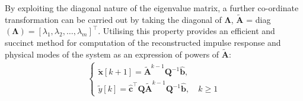 By exploiting the diagonal nature of the eigenvalue matrix, a further co-ordinate transformation can be carried out by taking the diagonal of $\mathbf{\Lambda}$, $\tilde{\mathbf{A}}$ = diag$(\mathbf{\Lambda}) = [\lambda_1, \lambda_2, \dots, \lambda_m]^{\top}$. Utilising this property provides an efficient and succinct method for computation of the reconstructed impulse response and physical modes of the system as an expression of powers of $\tilde{\mathbf{A}}$:
\begin{align}
\label{eq:markov-again}
\begin{cases}
    \mathbf{\tilde{x}}[k + 1] =  \tilde{\mathbf{A}}^{k-1} \mathbf{Q}^{-1} \hat{\mathbf{b}}, \\
    \tilde{y}[k] =  \hat{\mathbf{c}}^{\top} \mathbf{Q} \tilde{\mathbf{A}}^{k-1}\mathbf{Q}^{-1}\hat{\mathbf{b}}, \quad k \geq 1
\end{cases}
\end{align}

